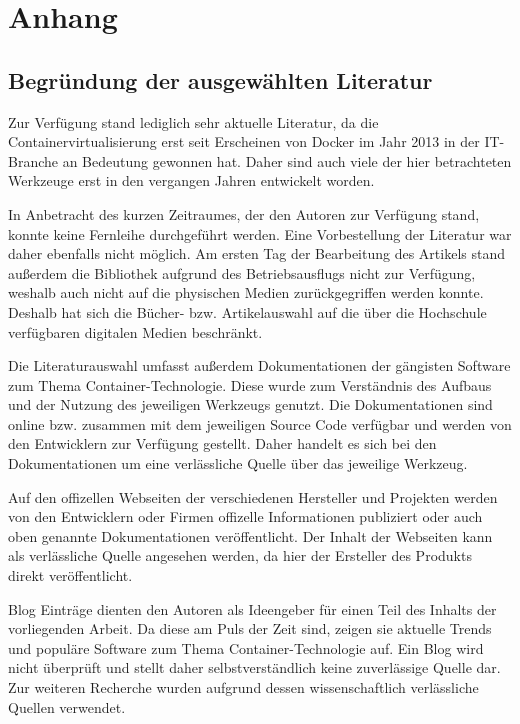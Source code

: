 \section{Anhang}
\label{sec:anhang}
\subsection{Begründung der ausgewählten Literatur}
\label{app:BegruendungLiteratur}
Zur Verfügung stand lediglich sehr aktuelle Literatur, da die Containervirtualisierung erst seit Erscheinen von Docker im Jahr 2013 in der IT-Branche an Bedeutung gewonnen hat. Daher sind auch viele der hier betrachteten Werkzeuge erst in den vergangen Jahren entwickelt worden.

In  Anbetracht des kurzen Zeitraumes, der den Autoren zur Verfügung stand, konnte keine Fernleihe durchgeführt werden.
Eine Vorbestellung der Literatur war daher ebenfalls nicht möglich.
Am ersten Tag der Bearbeitung des Artikels stand außerdem die Bibliothek aufgrund des Betriebsausflugs nicht zur Verfügung, weshalb auch nicht auf die physischen Medien zurückgegriffen werden konnte.
Deshalb hat sich die Bücher- bzw. Artikelauswahl auf die über die Hochschule verfügbaren digitalen Medien beschränkt.

Die  Literaturauswahl umfasst außerdem Dokumentationen der gängisten Software zum Thema Container-Technologie.
Diese wurde zum Verständnis des Aufbaus und der Nutzung des jeweiligen Werkzeugs genutzt. 
Die Dokumentationen sind online bzw. zusammen mit dem jeweiligen Source Code verfügbar und werden von den Entwicklern zur  Verfügung gestellt. 
Daher handelt es sich bei den Dokumentationen um eine verlässliche Quelle über das jeweilige Werkzeug.


Auf den offizellen Webseiten der verschiedenen Hersteller und Projekten werden von den Entwicklern oder Firmen offizelle Informationen publiziert oder auch oben genannte Dokumentationen veröffentlicht. Der Inhalt der Webseiten kann als verlässliche Quelle angesehen werden, da hier der Ersteller des Produkts direkt veröffentlicht.


Blog Einträge dienten den Autoren als Ideengeber für einen Teil des Inhalts der vorliegenden Arbeit.
Da diese am Puls der Zeit sind, zeigen sie aktuelle Trends und populäre Software zum Thema Container-Technologie auf.
Ein Blog wird nicht überprüft und stellt daher selbstverständlich keine zuverlässige Quelle dar.
Zur weiteren Recherche wurden aufgrund dessen wissenschaftlich verlässliche Quellen verwendet.